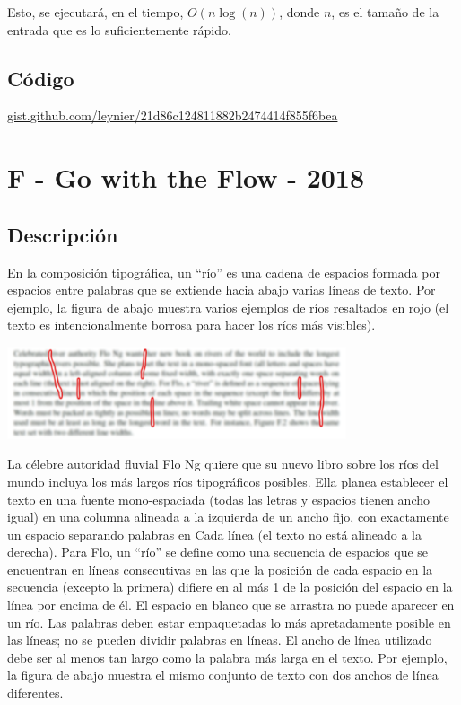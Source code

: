 \documentclass[12pt]{article}
\newcommand{\nl}{\vspace{0.3cm}}
\begin{document}
\nl

Esto, se ejecutará, en el tiempo, $O(n\log(n))$, donde $n$, es el tamaño de la entrada que es lo suficientemente rápido.

\subsection{Código}

\href{https://gist.github.com/leynier/21d86c124811882b2474414f855f6bea}{gist.github.com/leynier/21d86c124811882b2474414f855f6bea}

\section{F - Go with the Flow - 2018}

\subsection{Descripción}

En la composición tipográfica, un “río” es una cadena de espacios formada por espacios entre palabras que se extiende hacia abajo varias líneas de texto. Por ejemplo, la figura de abajo muestra varios ejemplos de ríos resaltados en rojo (el texto es
intencionalmente borrosa para hacer los ríos más visibles).

\begin{center}
	\includegraphics[width=10cm]{images/image1.png}
\end{center}

La célebre autoridad fluvial Flo Ng quiere que su nuevo libro sobre los ríos del mundo incluya los más largos ríos tipográficos posibles. Ella planea establecer el texto en una fuente mono-espaciada (todas las letras y espacios tienen ancho igual) en una columna alineada a la izquierda de un ancho fijo, con exactamente un espacio separando palabras en
Cada línea (el texto no está alineado a la derecha). Para Flo, un “río” se define como una secuencia de espacios que se encuentran en líneas consecutivas en las que la posición de cada espacio en la secuencia (excepto la primera) difiere en al más 1 de la posición del espacio en la línea por encima de él. El espacio en blanco que se arrastra no puede aparecer en un río. Las palabras deben estar empaquetadas lo más apretadamente posible en las líneas; no se pueden dividir palabras en líneas. El ancho de línea utilizado debe ser al menos tan largo como la palabra más larga en el texto. Por ejemplo, la figura de abajo muestra el mismo conjunto de texto con dos anchos de línea diferentes.
\end{document}
